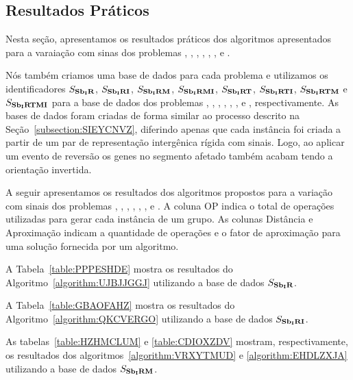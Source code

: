 \subsection{Resultados Práticos}

Nesta seção, apresentamos os resultados práticos dos algoritmos apresentados para a varaiação com sinas dos problemas \SbIR{}, \SbIRI{}, \SbIRM{}, \SbIRMI{}, \SbIRT{}, \SbIRTI{}, \SbIRTM{} e \SbIRTMI{}.

Nós também criamos uma base de dados para cada problema e utilizamos os identificadores $S_{\textbf{Sb\textsubscript{I}R}}{}$, $S_{\textbf{Sb\textsubscript{I}RI}}{}$, $S_{\textbf{Sb\textsubscript{I}RM}}{}$, $S_{\textbf{Sb\textsubscript{I}RMI}}{}$, $S_{\textbf{Sb\textsubscript{I}RT}}{}$, $S_{\textbf{Sb\textsubscript{I}RTI}}{}$, $S_{\textbf{Sb\textsubscript{I}RTM}}{}$ e $S_{\textbf{Sb\textsubscript{I}RTMI}}{}$ para a base de dados dos problemas \SbIR{}, \SbIRI{}, \SbIRM{}, \SbIRMI{}, \SbIRT{}, \SbIRTI{}, \SbIRTM{} e \SbIRTMI{}, respectivamente. As bases de dados foram criadas de forma similar ao processo descrito na Seção~\ref{subsection:SIEYCNVZ}, diferindo apenas que cada instância foi criada a partir de um par de representação intergênica rígida com sinais. Logo, ao aplicar um evento de reversão os genes no segmento afetado também acabam tendo a orientação invertida.

A seguir apresentamos os resultados dos algoritmos propostos para a variação com sinais dos problemas \SbIR{}, \SbIRI{}, \SbIRM{}, \SbIRMI{}, \SbIRT{}, \SbIRTI{}, \SbIRTM{} e \SbIRTMI{}. A coluna OP indica o total de operações utilizadas para gerar cada instância de um grupo. As colunas Distância e Aproximação indicam a quantidade de operações e o fator de aproximação para uma solução fornecida por um algoritmo.

A Tabela~\ref{table:PPPESHDE} mostra os resultados do Algoritmo~\ref{algorithm:UJBJJGGJ} utilizando a base de dados $S_{\textbf{Sb\textsubscript{I}R}}{}$.



A Tabela~\ref{table:GBAOFAHZ} mostra os resultados do Algoritmo~\ref{algorithm:QKCVERGO} utilizando a base de dados $S_{\textbf{Sb\textsubscript{I}RI}}{}$.



As tabelas~\ref{table:HZHMCLUM} e \ref{table:CDIOXZDV} mostram, respectivamente, os resultados dos algoritmos~\ref{algorithm:VRXYTMUD} e \ref{algorithm:EHDLZXJA} utilizando a base de dados $S_{\textbf{Sb\textsubscript{I}RM}}{}$.





